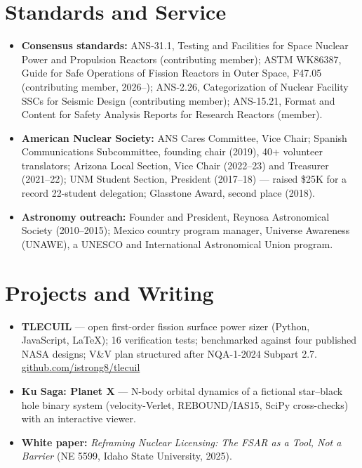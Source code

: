 \documentclass[10pt,letterpaper]{article}
\begin{document}
\section{Standards and Service}
\begin{itemize}
  \item \textbf{Consensus standards:} ANS-31.1, Testing and Facilities for Space Nuclear Power and Propulsion Reactors (contributing member); ASTM WK86387, Guide for Safe Operations of Fission Reactors in Outer Space, F47.05 (contributing member, 2026--); ANS-2.26, Categorization of Nuclear Facility SSCs for Seismic Design (contributing member); ANS-15.21, Format and Content for Safety Analysis Reports for Research Reactors (member).
  \item \textbf{American Nuclear Society:} ANS Cares Committee, Vice Chair; Spanish Communications Subcommittee, founding chair (2019), 40+ volunteer translators; Arizona Local Section, Vice Chair (2022--23) and Treasurer (2021--22); UNM Student Section, President (2017--18) — raised \$25K for a record 22-student delegation; Glasstone Award, second place (2018).
  \item \textbf{Astronomy outreach:} Founder and President, Reynosa Astronomical Society (2010--2015); Mexico country program manager, Universe Awareness (UNAWE), a UNESCO and International Astronomical Union program.
\end{itemize}

\section{Projects and Writing}
\begin{itemize}
  \item \textbf{TLECUIL} — open first-order fission surface power sizer (Python, JavaScript, LaTeX); 16 verification tests; benchmarked against four published NASA designs; V\&V plan structured after NQA-1-2024 Subpart 2.7. \href{https://github.com/istrong8/tlecuil}{github.com/istrong8/tlecuil}
  \item \textbf{Ku Saga: Planet X} — N-body orbital dynamics of a fictional star–black hole binary system (velocity-Verlet, REBOUND/IAS15, SciPy cross-checks) with an interactive viewer.
  \item \textbf{White paper:} \emph{Reframing Nuclear Licensing: The FSAR as a Tool, Not a Barrier} (NE 5599, Idaho State University, 2025).
\end{itemize}
\end{document}
